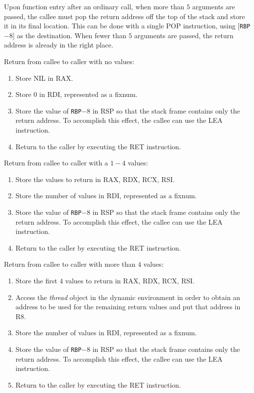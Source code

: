 Upon function entry after an ordinary call, when more than $5$
arguments are passed, the callee must pop the return address off the
top of the stack and store it in its final location.  This can be done
with a single POP instruction, using [\texttt{RBP}$ - 8$] as the
destination.  When fewer than $5$ arguments are passed, the return
address is already in the right place.

Return from callee to caller with no values:

\begin{enumerate}
\item Store NIL in RAX.
\item Store $0$ in RDI, represented as a fixnum.
\item Store the value of \texttt{RBP}$ - 8$ in RSP so that the stack frame
  contains only the return address.  To accomplish this effect, the
  callee can use the LEA instruction.
\item Return to the caller by executing the RET instruction.
\end{enumerate}

Return from callee to caller with a $1 - 4$ values:

\begin{enumerate}
\item Store the values to return in RAX, RDX, RCX, RSI.
\item Store the number of values in RDI, represented as a fixnum.
\item Store the value of \texttt{RBP}$ - 8$ in RSP so that the stack frame
  contains only the return address.  To accomplish this effect, the
  callee can use the LEA instruction.
\item Return to the caller by executing the RET instruction.
\end{enumerate}

Return from callee to caller with more than $4$ values:

\begin{enumerate}
\item Store the first $4$ values to return in RAX, RDX, RCX, RSI.
\item Access the \emph{thread} object in the dynamic environment in
  order to obtain an address to be used for the remaining return
  values and put that address in R8.
\item Store the number of values in RDI, represented as a fixnum.
\item Store the value of \texttt{RBP}$ - 8$ in RSP so that the stack frame
  contains only the return address.  To accomplish this effect, the
  callee can use the LEA instruction.
\item Return to the caller by executing the RET instruction.
\end{enumerate}

